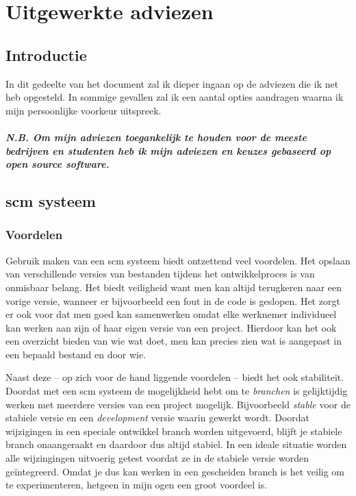 \chapter{Uitgewerkte adviezen}

\section{Introductie}

In dit gedeelte van het document zal ik dieper ingaan op de adviezen die ik net heb opgesteld. In sommige gevallen zal ik een aantal opties aandragen waarna ik mijn persoonlijke voorkeur uitspreek.

\paragraph{N.B. Om mijn adviezen toegankelijk te houden voor de meeste bedrijven en studenten heb ik mijn adviezen en keuzes gebaseerd op open source software.}

\section{{\sc scm} systeem}

\subsection{Voordelen}

Gebruik maken van een {\sc scm} systeem biedt ontzettend veel voordelen. Het opslaan van verschillende versies van bestanden tijdens het ontwikkelproces is van onmisbaar belang. Het biedt veiligheid want men kan altijd terugkeren naar een vorige versie, wanneer er bijvoorbeeld een fout in de code is geslopen. Het zorgt er ook voor dat men goed kan samenwerken omdat elke werknemer individueel kan werken aan zijn of haar eigen versie van een project. Hierdoor kan het ook een overzicht bieden van wie wat doet, men kan precies zien wat is aangepast in een bepaald bestand en door wie.

Naast deze -- op zich voor de hand liggende voordelen -- biedt het ook stabiliteit. Doordat met een {\sc scm} systeem de mogelijkheid hebt om te \emph{branchen} is gelijktijdig werken met meerdere versies van een project mogelijk. Bijvoorbeeld \emph{stable} voor de stabiele versie en een \emph{development} versie waarin gewerkt wordt. Doordat wijzigingen in een speciale ontwikkel branch worden uitgevoerd, blijft je stabiele branch onaangeraakt en daardoor dus altijd stabiel. In een ideale situatie worden alle wijzingingen uitvoerig getest voordat ze in de stabiele versie worden geïntegreerd. Omdat je dus kan werken in een gescheiden branch is het veilig om te experimenteren, hetgeen in mijn ogen een groot voordeel is.

